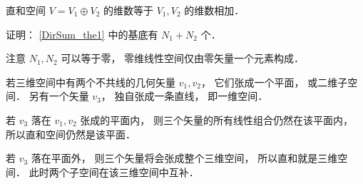 \begin{corollary}{}\label{DirSum_cor1}
直和空间 $V = V_1 \oplus V_2$ 的维数等于 $V_1, V_2$ 的维数相加．
\end{corollary}
证明： \autoref{DirSum_the1} 中的基底有 $N_1 + N_2$ 个．

注意 $N_1, N_2$ 可以等于零， 零维线性空间仅由零矢量一个元素构成．

\begin{example}{}\label{DirSum_ex1}
若三维空间中有两个不共线的几何矢量 ${v_1}, {v_2}$， 它们张成一个平面， 或二维子空间． 另有一个矢量 ${v_3}$， 独自张成一条直线， 即一维空间．

若 ${v_3}$ 落在 ${v_1}, {v_2}$ 张成的平面内， 则三个矢量的所有线性组合仍然在该平面内， 所以直和空间仍然是该平面．

若 ${v_3}$ 落在平面外， 则三个矢量将会张成整个三维空间， 所以直和就是三维空间． 此时两个子空间在该三维空间中互补．
\end{example}

